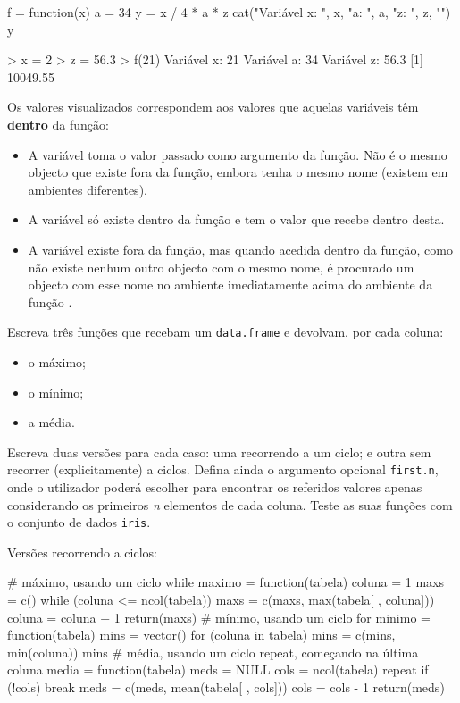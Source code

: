 \documentclass{exam}
\begin{document}
\begin{questions}
	\begin{solution}
		\begin{rcode}
			f = function(x) {
				a = 34
				y = x / 4 * a * z
				cat("Variável x: ", x, "\nVariável a: ", a, " z: ", z, "\n")
				y
			}
			
			> x = 2
			> z = 56.3
			> f(21)
			Variável x:  21 
			Variável a:  34 
			Variável z:  56.3 
			[1] 10049.55
		\end{rcode}
		Os valores visualizados correspondem aos valores que aquelas variáveis têm \textbf{dentro} da função:
		\begin{itemize}
			\item A variável  toma o valor passado como argumento da função. Não é o mesmo objecto que existe fora da função, embora tenha o mesmo nome (existem em ambientes diferentes).
			\item A variável  só existe dentro da função e tem o valor que recebe dentro desta.
			\item A variável  existe fora da função, mas quando acedida dentro da função, como não existe nenhum outro objecto com o mesmo nome, é procurado um objecto com esse nome no ambiente imediatamente acima do ambiente da função \rinline{f}.
		\end{itemize}
	\end{solution}
	
	\question Escreva três funções que recebam um \texttt{data.frame} e devolvam, por cada coluna:
		\begin{itemize}
			\item o máximo;
			\item o mínimo;
			\item a média.
		\end{itemize}
	Escreva duas versões para cada caso: uma recorrendo a um ciclo; e outra sem recorrer (explicitamente) a ciclos. Defina ainda o argumento opcional \texttt{first.n}, onde o utilizador poderá escolher para encontrar os referidos valores apenas considerando os primeiros \textit{n} elementos de cada coluna. Teste as suas funções com o conjunto de dados \texttt{iris}.
	
	\begin{solution}
		Versões recorrendo a ciclos:
		\begin{rcode}
			# máximo, usando um ciclo while
			maximo = function(tabela) {
				coluna = 1
				maxs = c()
				while (coluna <= ncol(tabela)) {
					maxs = c(maxs, max(tabela[ , coluna]))
					coluna = coluna + 1
				}
				return(maxs)
			}
			# mínimo, usando um ciclo for
			minimo = function(tabela) {
				mins = vector()
				for (coluna in tabela) {
					mins = c(mins, min(coluna))
				}
				mins
			}
			# média, usando um ciclo repeat, começando na última coluna
			media = function(tabela) {
				meds = NULL
				cols = ncol(tabela)
				repeat {
					if (!cols) {
						break
					}
					meds = c(meds, mean(tabela[ , cols]))
					cols = cols - 1
				}
				return(meds)
			}
		\end{rcode}
		

\end{solution}
\end{questions}
\end{document}
